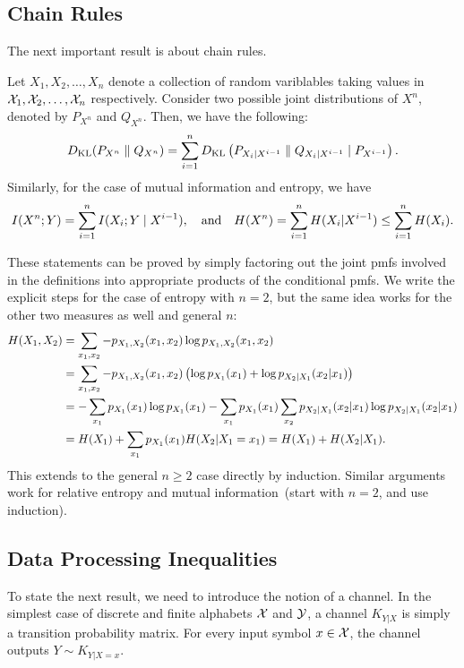 \documentclass[12pt]{article}
\begin{document}
\subsection{Chain Rules}
The next important result is about chain rules. 
\begin{theorem}
\label{theorem:chain-rules}
Let $X_1, X_2, \ldots, X_n$ denote a collection of random variblables taking values in ${\cal X}_1, {\cal X}_2, \ldots, {\cal X}_n$ respectively. Consider two possible joint distributions of $X^n$, denoted by $P_{X^n}$ and $Q_{X^n}$. Then, we have the following: 
\begin{align}
D_{\text{KL}}(P_{X^n} \parallel Q_{X^n}) = \sum_{i=1}^n D_{\text{KL}}\left( P_{X_i|X^{i-1}} \parallel Q_{X_i|X^{i-1}} \mid P_{X^{i-1}} \right). 
\end{align}
Similarly, for the case of mutual information and entropy, we have 
\begin{align}
I(X^n; Y) = \sum_{i=1}^n I(X_i; Y \mid X^{i-1}),  \quad \text{and} \quad H(X^n) = \sum_{i=1}^n H(X_i|X^{i-1}) \leq \sum_{i=1}^n H(X_i).
\end{align}
\end{theorem}
These statements can be proved by simply factoring out the joint pmfs involved in the definitions into appropriate products of the conditional pmfs. We write the explicit steps for the case of entropy with $n=2$, but the same idea works for the other two measures as well and general $n$: 
\begin{align}
H(X_1, X_2) &= \sum_{x_1, x_2} -p_{X_1, X_2}(x_1, x_2) \log p_{X_1, X_2}(x_1, x_2)  \\
&= \sum_{x_1, x_2} -p_{X_1, X_2}(x_1, x_2) \left( \log p_{X_1}(x_1) + \log p_{X_2|X_1}(x_2|x_1) \right)  \\
& = -\sum_{x_1} p_{X_1}(x_1)\log p_{X_1}(x_1) - \sum_{x_1} p_{X_1}(x_1) \sum_{x_2} p_{X_2|X_1}(x_2|x_1) \log p_{X_2|X_1}(x_2|x_1) \\
& = H(X_1) + \sum_{x_1} p_{X_1}(x_1) H(X_2|X_1=x_1) = H(X_1) + H(X_2|X_1). 
\end{align}
This extends to the general $n \geq 2$ case directly by induction. Similar arguments work for relative entropy and mutual information~(start with $n=2$, and use induction). 

\subsection{Data Processing Inequalities}
To state the next result, we need to introduce the notion of a channel. In the simplest case of discrete and finite alphabets ${\cal X}$ and ${\cal Y}$, a channel $K_{Y|X}$ is simply a transition probability matrix. For every input symbol $x \in {\cal X}$, the channel outputs $Y \sim K_{Y|X=x}$. 
\end{document}
